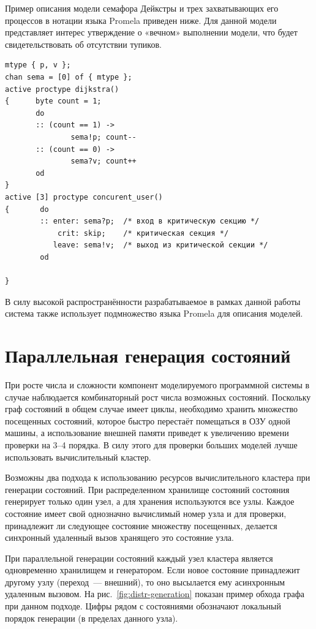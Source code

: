\documentclass[12pt,a4paper,article]{bpm2}
\begin{document}
Пример описания модели семафора Дейкстры и трех захватывающих его процессов в нотации языка Promela приведен ниже.
Для данной модели представляет интерес утверждение о «вечном» выполнении модели, что будет свидетельствовать об отсутствии тупиков.

\begin{verbatim}
mtype { p, v };
chan sema = [0] of { mtype };
active proctype dijkstra()
{      byte count = 1;
       do
       :: (count == 1) ->
               sema!p; count--
       :: (count == 0) ->
               sema?v; count++
       od
}
active [3] proctype concurent_user()
{       do
        :: enter: sema?p;  /* вход в критическую секцию */
            crit: skip;    /* критическая секция */
           leave: sema!v;  /* выход из критической секции */
        od

}
\end{verbatim}

В силу высокой распространённости разрабатываемое в рамках данной работы система также использует подмножество языка Promela для описания моделей.

\section{Параллельная генерация состояний}
\label{sec:pargen}

При росте числа и сложности компонент моделируемого программной системы в случае наблюдается комбинаторный рост числа
возможных состояний.
Поскольку граф состояний в общем случае имеет циклы, необходимо хранить множество посещенных состояний, которое быстро перестаёт помещаться в ОЗУ одной машины, а использование внешней памяти приведет к увеличению времени проверки на 3--4 порядка. В силу этого для проверки больших моделей лучше использовать вычислительный кластер.

Возможны два подхода к использованию ресурсов вычислительного кластера при генерации состояний.
При распределенном хранилище состояний состояния генерирует только один узел, а для хранения используются все узлы.
Каждое состояние имеет свой однозначно вычислимый номер узла и для проверки, принадлежит ли следующее состояние множеству посещенных, делается синхронный удаленный вызов хранящего это состояние узла.

При параллельной генерации состояний каждый узел кластера является одновременно хранилищем и генератором.
Если новое состояние принадлежит другому узлу (переход~--- внешний), то оно высылается ему асинхронным удаленным вызовом. На рис.~\ref{fig:distr-generation} показан пример обхода графа при данном подходе.
Цифры рядом с состояниями обозначают локальный порядок генерации (в пределах данного узла).
\end{document}
